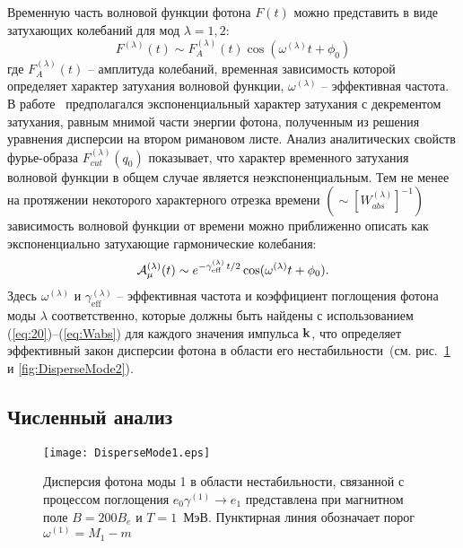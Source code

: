 Временную часть волновой функции фотона $F(t)$ можно представить в виде затухающих колебаний для мод $\lambda=1,2$:
\begin{equation}\label{eq:Fm}
	F^{(\lambda)}(t)\sim F^{(\lambda)}_A(t) \cos(\omega^{(\lambda)} t+\phi_0)
\end{equation}
где $F^{(\lambda)}_A(t)$ -- амплитуда колебаний,
временная зависимость которой определяет
характер затухания волновой функции,
$\omega^{(\lambda)}$ -- эффективная
частота. В работе~\cite{Shabad:1988}
предполагался экспоненциальный характер затухания с декрементом затухания, равным мнимой части энергии фотона, полученным из решения уравнения дисперсии на втором римановом листе. Анализ  аналитических свойств фурье-образа $F^{(\lambda)}_{cut}(q_0)$ показывает, что характер временного затухания волновой функции в общем случае является неэкспоненциальным. Тем не менее на протяжении некоторого характерного отрезка времени $(\sim [W^{(\lambda)}_{abs}]^{-1})$
зависимость волновой функции от времени можно приближенно описать как 
экспоненциально затухающие гармонические колебания:
%
\begin{equation}\label{eq:ApproxA}
{\cal A}^{(\lambda)}_\mu(t) \sim e^{- \gamma^{(\lambda)}_\text{eff} \, t/2} \cos 
(\omega^{(\lambda)} t + \phi_0).
\end{equation}
%
Здесь $\omega^{(\lambda)}$ и $\gamma^{(\lambda)}_\text{eff}$ -- эффективная 
частота и коэффициент  
поглощения фотона моды $\lambda$ соответственно, которые должны быть найдены с использованием 
(\ref{eq:20})--(\ref{eq:Wabs}) для каждого значения импульса ${\bf k}$, что определяет эффективный 
закон дисперсии фотона в области его нестабильности~(см. рис.~\ref{fig:DisperseMode1} и \ref{fig:DisperseMode2}).


\subsection{Численный анализ}



\begin{figure}[t]\centering
	\texttt{[image: DisperseMode1.eps]}
	\caption{Дисперсия фотона моды 1 в области нестабильности, связанной с процессом поглощения $e_0 \gamma^{(1)}\to e_1$ представлена при магнитном поле $B=200B_e$ и $T=1$~МэВ. Пунктирная линия обозначает порог $\omega^{(1)}=M_1-m$ \label{fig:DisperseMode1}}
\end{figure}

